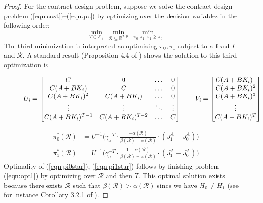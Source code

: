 \documentclass[letterpaper, 10 pt, conference]{ieeeconf}  %
\begin{document}
\begin{proof} 
For the contract design problem, suppose we solve the contract design problem (\ref{eqn:cost})--(\ref{eqn:pc}) by optimizing over the decision variables in the following order:
\begin{equation}
\label{eqn:opt1}
\min_{T\in\mathbb{Z}_+}\,\min_{\mathcal{R}\subseteq\mathbb{R}^{T\cdot p}}\ \min_{\pi_0,\pi_1 : \pi_1 \geq \pi_0}
\end{equation}
The third minimization is interpreted as optimizing $\pi_0,\pi_1$ subject to a fixed $T$ and $\mathcal{R}$. A standard result (Proposition 4.4 of \cite{Laffont}) shows  the solution to this third optimization is 
\begin{figure}[!t]
\normalsize
\begin{equation}
\label{eqn:uvw}
    U_i = \begin{bmatrix}
C & 0 & \dots & 0 \\
C(A+BK_i) & C & \dots & 0 \\
C(A+BK_i)^2 & C(A+BK_i) & \dots & 0 \\
\vdots & \vdots & \ddots & \vdots \\
C(A+BK_i)^{T-1} & C(A+BK_i)^{T-2} & \dots & C
\end{bmatrix}\qquad  V_i = \begin{bmatrix} C(A+BK_i)^{\hphantom{1}} \\ C(A+BK_i)^2 \\ C(A+BK_i)^3 \\ \vdots \\ C(A+BK_i)^T \end{bmatrix}
\end{equation}
\hrulefill %
\vspace*{4pt}
\end{figure}
\begin{align}
\pi_0^*(\mathcal{R}) &= \textstyle U^{-1}\Big(\gamma_a^{-T}\cdot\frac{-\alpha(\mathcal{R})}{\beta(\mathcal{R}) - \alpha(\mathcal{R})}\cdot(J_1^A-J_0^A)\Big)\\
\pi_1^*(\mathcal{R}) &= \textstyle U^{-1}\Big(\gamma_a^{-T}\cdot\frac{1-\alpha(\mathcal{R})}{\beta(\mathcal{R}) - \alpha(\mathcal{R})}\cdot(J_1^A-J_0^A)\Big)
\end{align}
Optimality of (\ref{eqn:pi0star}), (\ref{eqn:pi1star}) follows by finishing problem (\ref{eqn:opt1}) by optimizing over $\mathcal{R}$ and then $T$. This optimal solution exists because there exists $\mathcal{R}$ such that $\beta(\mathcal{R}) > \alpha(\mathcal{R})$ since we have $H_0 \neq H_1$ (see for instance Corollary 3.2.1 of \cite{lehmann2022testing}).


\end{proof}
\end{document}
